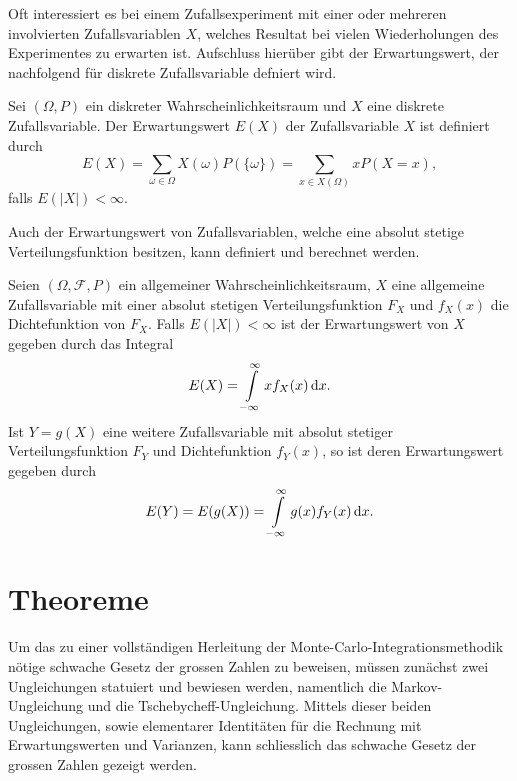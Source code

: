 \documentclass[a4paper,12pt]{article}
\begin{document}
Oft interessiert es bei einem Zufallsexperiment mit einer oder mehreren involvierten Zufallsvariablen $X$, welches Resultat bei vielen Wiederholungen des Experimentes zu erwarten ist. Aufschluss hierüber gibt der Erwartungswert, der nachfolgend für diskrete Zufallsvariable defniert wird.

\begin{dn}\label{ErwartungswertdiskreterZufallsvariablen}
Sei $(\Omega,P)$ ein diskreter Wahrscheinlichkeitsraum und $X$ eine diskrete Zufallsvariable. Der Erwartungswert $E(X)$ der Zufallsvariable $X$ ist definiert durch \begin{equation}E(X) = \sum_{\omega \in \Omega} X(\omega)P(\{\omega\}) = \sum_{x \in X(\Omega)}xP(X=x),\end{equation} falls $E(|X|) < \infty.$
\end{dn}

Auch der Erwartungswert von Zufallsvariablen, welche eine absolut stetige Verteilungsfunktion besitzen, kann definiert und berechnet werden.

\begin{dn}\label{ErwartungswertallgemeinerZufallsvariablenmit absolutstetigerVerteilung}
Seien $(\Omega,\mathcal{F},P)$ ein allgemeiner Wahrscheinlichkeitsraum, $X$ eine allgemeine Zufallsvariable mit einer absolut stetigen Verteilungsfunktion $F_X$ und $f_X(x)$ die Dichtefunktion von $F_X.$ Falls $E(|X|) < \infty$ ist der Erwartungswert von $X$ gegeben durch das Integral \begin{equation}E(X) = \int\displaylimits_{-\infty}^{\infty}x f_X(x)\,\mathrm{d}x.\end{equation} Ist $Y = g(X)$ eine weitere Zufallsvariable mit absolut stetiger Verteilungsfunktion $F_Y$ und Dichtefunktion $f_Y(x)$, so ist deren Erwartungswert gegeben durch \begin{equation}E(Y)= E(g(X)) = \int\displaylimits_{-\infty}^{\infty}g(x) f_Y(x)\,\mathrm{d}x.\end{equation}
\end{dn}

\section{Theoreme}
Um das zu einer vollständigen Herleitung der Monte-Carlo-Integrationsmethodik nötige schwache Gesetz der grossen Zahlen zu beweisen, müssen zunächst zwei Ungleichungen statuiert und bewiesen werden, namentlich die Markov-Ungleichung und die Tschebycheff-Ungleichung. Mittels dieser beiden Ungleichungen, sowie elementarer Identitäten für die Rechnung mit Erwartungswerten und Varianzen, kann schliesslich das schwache Gesetz der grossen Zahlen gezeigt werden.
\end{document}
